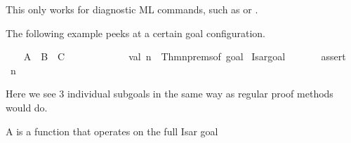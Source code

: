 \begin{isabellebody}
\begin{isamarkuptext}
\begin{description}
  This only works for diagnostic ML commands, such as \hyperlink{command.ML-val}{\mbox{}} or \hyperlink{command.ML-command}{\mbox{}}.

  \end{description}%
\end{isamarkuptext}%
\isamarkuptrue%
%
\endisatagmlantiq
{\isafoldmlantiq}%
%
\isadelimmlantiq
%
\endisadelimmlantiq
%
\isadelimmlex
%
\endisadelimmlex
%
\isatagmlex
%
\begin{isamarkuptext}%
The following example peeks at a certain goal configuration.%
\end{isamarkuptext}%
\isamarkuptrue%
%
\endisatagmlex
{\isafoldmlex}%
%
\isadelimmlex
%
\endisadelimmlex
{}\isamarkupfalse%
\isanewline
{}\isanewline
%
\isadelimproof
\ \ %
\endisadelimproof
%
\isatagproof
{}\isamarkupfalse%
\ A\ \ B\ \ C%
\endisatagproof
{\isafoldproof}%
%
\isadelimproof
\isanewline
%
\endisadelimproof
%
\isadelimML
\ \ \ \ %
\endisadelimML
%
\isatagML
{}\isamarkupfalse%
\ {}\isanewline
\ \ \ \ \ \ val\ n\ {}\ Thm{}nprems{}of\ {}{}goal\ %
\isaantiq
Isar{}goal{}%
\endisaantiq
{}{}\isanewline
\ \ \ \ \ \ %
\isaantiq
assert{}%
\endisaantiq
\ {}n\ {}\ {}{}{}\isanewline
\ \ \ \ {}%
\endisatagML
{\isafoldML}%
%
\isadelimML
\isanewline
%
\endisadelimML
%
\isadelimproof
\ \ \ \ %
\endisadelimproof
%
\isatagproof
{}\isamarkupfalse%
%
\endisatagproof
{\isafoldproof}%
%
\isadelimproof
%
\endisadelimproof
%
\begin{isamarkuptext}%
Here we see 3 individual subgoals in the same way as regular
  proof methods would do.%
\end{isamarkuptext}%
\isamarkuptrue%
%
\isamarkuptrue%
%
\begin{isamarkuptext}%
A  is a function  that operates on the full Isar goal

\end{isamarkuptext}
\end{isabellebody}
